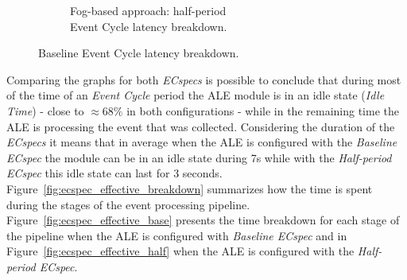 \begin{figure}[ht!]
\begin{subfigure}{.5\textwidth}
   \caption{Fog-based approach: half-period\\Event Cycle latency breakdown.}
   \label{fig:ecspec_half}
 \end{subfigure}
 \caption{Baseline Event Cycle latency breakdown.}
 \label{fig:ecspec_breakdown}
\end{figure}

Comparing the graphs for both \textit{ECspecs} is possible to conclude that during most of the time of
an \textit{Event Cycle} period the \gls{ALE} module is in an idle state (\textit{Idle Time}) - close to $\approx68\%$
in both configurations - while in the remaining time the \gls{ALE} is processing the event that was
collected. Considering the duration of the \textit{ECspecs} it means that in average when the \gls{ALE}
is configured with the \textit{Baseline ECspec} the module can be in an idle state during 7s while
with the \textit{Half-period ECspec} this idle state can last for 3 seconds.\\

Figure~\ref{fig:ecspec_effective_breakdown} summarizes how the time is spent during the stages of the
event processing pipeline. Figure~\ref{fig:ecspec_effective_base} presents the time breakdown for
each stage of the pipeline when the \gls{ALE} is configured with \textit{Baseline ECspec} and in
Figure~\ref{fig:ecspec_effective_half} when the \gls{ALE} is configured with the \textit{Half-period ECspec}.\\

